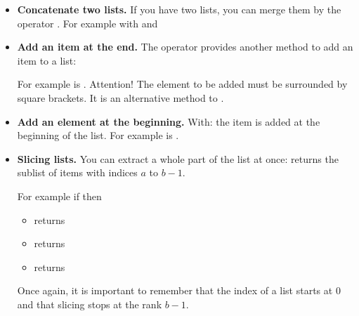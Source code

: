\documentclass[11pt,class=report,crop=false]{standalone}
\begin{document}
\begin{cours}[List (3)]
\sauteligne
\begin{itemize}
  \item \textbf{Concatenate two  lists.} If you have two lists, you can merge them by the operator \og{}\ci{+}\fg{}. For example with 
   and  
  
    
  \item \textbf{Add an item at the end.} The operator \og{}\ci{+}\fg{} provides another method to add an item to a list: 
  
  For example \ci{[1,2,3,4] + [5]} is \ci{[1,2,3,4,5]}.
  Attention! The element to be added must be surrounded by square brackets.   
  It is an alternative method to .
  
  \item \textbf{Add an element at the beginning.} With: 
  the item is added at the beginning of the list.
  For example \ci{[5] + [1,2,3,4]} is \ci{[5,1,2,3,4]}. 
  
  \item \textbf{Slicing lists.} You can extract a whole part of the list at once:  returns the sublist of items with indices $a$ to $b-1$.
  
  \smallskip
  
  
    For example if  then  
  \begin{itemize}
    \item {} returns \ci{["B","C","D"]}
    \item {} returns \ci{["A","B"]}
    \item {} returns \ci{["E","F","G"]}
  \end{itemize} 
  Once again, it is important to remember that the index of a list starts at $0$ and that slicing  stops at the rank $b-1$.
   
\end{itemize}
\end{cours}

\end{document}
